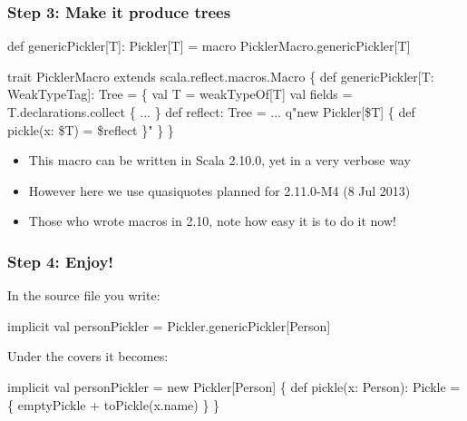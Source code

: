\documentclass[svgnames,hyperref={bookmarks=false}]{beamer}
\begin{document}
\begin{frame}[t, fragile]
\frametitle{Step 3: Make it produce trees}

\begin{semiverbatim}
def genericPickler[T]: Pickler[T] =
  macro PicklerMacro.genericPickler[T]

trait PicklerMacro extends scala.reflect.macros.Macro \{
  def genericPickler[T: WeakTypeTag]: \alert{Tree} = \{
    val T = weakTypeOf[T]
    val fields = T.declarations.collect \{ ... \}
    def reflect: \alert{Tree} = ...
    \alert{q"}new Pickler[\alert{\$}T] \{ def pickle(x: \alert{\$}T) = \alert{\$}reflect \}\alert{"}
  \}
\}

\end{semiverbatim}

\begin{itemize}
\item This macro can be written in Scala 2.10.0, yet in a very verbose way
\item However here we use quasiquotes planned for 2.11.0-M4 (8 Jul 2013)
\item Those who wrote macros in 2.10, note how easy it is to do it now!
\end{itemize}
\end{frame}

\begin{frame}[fragile]
\frametitle{Step 4: Enjoy!}

In the source file you write:
\begin{semiverbatim}
implicit val personPickler = Pickler.genericPickler[Person]

\end{semiverbatim}

Under the covers it becomes:
\begin{semiverbatim}
implicit val personPickler = new Pickler[Person] \{
  def pickle(x: Person): Pickle = \{
    emptyPickle + toPickle(x.name)
  \}
\}
\end{semiverbatim}
\end{frame}


\end{document}
